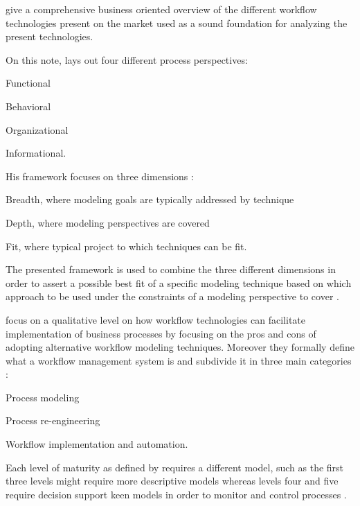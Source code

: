 \documentclass[draft=false]{seal_thesis}
\begin{document}
\citet{Georgakopoulos1995} give a comprehensive business oriented overview of the different workflow technologies present on the market used as a sound foundation for analyzing the present technologies.

On this note, \citet{Giaglis2001} lays out four different process perspectives:
\begin{enumerate*}
	\item Functional
	\item Behavioral
	\item Organizational
	\item Informational.
\end{enumerate*}

His framework focuses on three dimensions \citep{Giaglis2001}:
\begin{enumerate*}
	\item Breadth, where modeling goals are typically addressed by technique
	\item Depth, where modeling perspectives are covered
	\item Fit, where typical project to which techniques can be fit.
\end{enumerate*}

The presented framework is used to combine the three different dimensions in order to assert a possible best fit of a specific modeling technique based on which approach to be used under the constraints of a modeling perspective to cover \citep{Giaglis2001}.

\citet{Mentzas2001} focus on a qualitative level on how workflow technologies can facilitate implementation of business processes by focusing on the pros and cons of adopting alternative workflow modeling techniques. Moreover they formally define what a workflow management system is and subdivide it in three main categories \citep{Mentzas2001}:
\begin{enumerate*}
	\item Process modeling
	\item Process re-engineering
	\item Workflow implementation and automation.
\end{enumerate*}

Each level of maturity as defined by \citet{Macintosh1993} requires a different model, such as the first three levels might require more descriptive models whereas levels four and five require decision support keen models in order to monitor and control processes \citep{Mentzas2001}.
\end{document}
